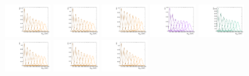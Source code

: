\begin{figure}[htbp]
  \centering
  \includegraphics[width=0.18\textwidth]{fig/analysis/templateSignalVsMX_fromDC_GbuToWW_MVV_mu_HP_bb_DEtaHi.pdf}
  \includegraphics[width=0.18\textwidth]{fig/analysis/templateSignalVsMX_fromDC_RadToWW_MVV_mu_HP_bb_DEtaHi.pdf}
  \includegraphics[width=0.18\textwidth]{fig/analysis/templateSignalVsMX_fromDC_ZprToWW_MVV_mu_HP_bb_DEtaHi.pdf}
  \includegraphics[width=0.18\textwidth]{fig/analysis/templateSignalVsMX_fromDC_WprToWZ_MVV_mu_HP_bb_DEtaHi.pdf}
  \includegraphics[width=0.18\textwidth]{fig/analysis/templateSignalVsMX_fromDC_WprToWH_MVV_mu_HP_bb_DEtaHi.pdf}\\
  \includegraphics[width=0.18\textwidth]{fig/analysis/templateSignalVsMX_fromDC_GbuToWW_MVV_mu_LP_bb_DEtaHi.pdf}
  \includegraphics[width=0.18\textwidth]{fig/analysis/templateSignalVsMX_fromDC_RadToWW_MVV_mu_LP_bb_DEtaHi.pdf}
  \includegraphics[width=0.18\textwidth]{fig/analysis/templateSignalVsMX_fromDC_ZprToWW_MVV_mu_LP_bb_DEtaHi.pdf}

\end{figure}
